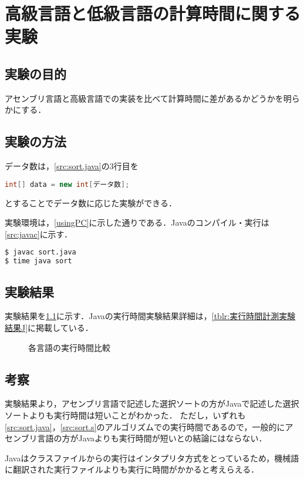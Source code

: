 \chapter{高級言語と低級言語の計算時間に関する実験}\label{chap4}
\section{実験の目的}
アセンブリ言語と高級言語での実装を比べて計算時間に差があるかどうかを明らかにする．
\section{実験の方法}
データ数は，\ref{src:sort.java}の3行目を
\begin{lstlisting}[caption={}, label={}, language={Java}, frame={none},numbers={none}]
int[] data = new int[データ数];
\end{lstlisting}
とすることでデータ数に応じた実験ができる．\par
実験環境は，\ref{usingPC}に示した通りである．{\ttfamily Java}のコンパイル・実行は\ref{src:javac}に示す．
\begin{lstlisting}[caption={{\ttfamily Java}コンパイル・実行時間の計測}, label={src:javac}, language={Bash},frame={single},numbers={none}]
$ javac sort.java
$ time java sort
\end{lstlisting}
\section{実験結果}
実験結果を\ref{fig:比較}に示す．{\ttfamily Java}の実行時間実験結果詳細は，\ref{tblr:実行時間計測実験結果J}に掲載している．
\begin{figure}[htb]
    \centering
    \caption{各言語の実行時間比較}
    \label{fig:比較}
\end{figure}
\section{考察}
実験結果より，アセンブリ言語で記述した選択ソートの方が{\ttfamily Java}で記述した選択ソートよりも実行時間は短いことがわかった．
ただし，いずれも\ref{src:sort.java}，\ref{src:sort.s}のアルゴリズムでの実行時間であるので，一般的にアセンブリ言語の方が{\ttfamily Java}よりも実行時間が短いとの結論にはならない．\par
{\ttfamily Java}はクラスファイルからの実行はインタプリタ方式をとっているため，機械語に翻訳された実行ファイルよりも実行に時間がかかると考えらえる．